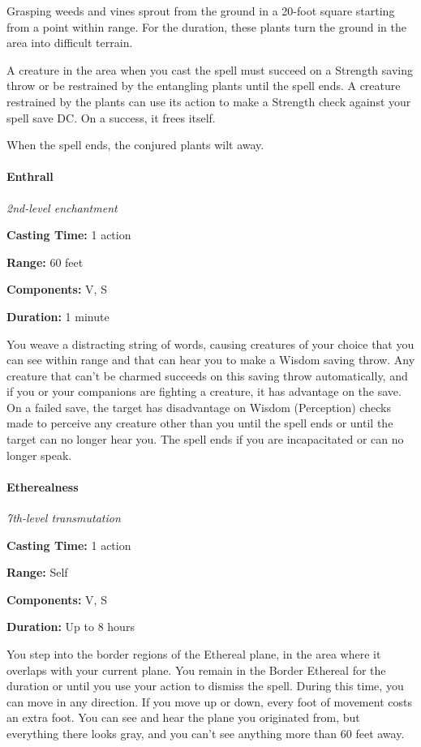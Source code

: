 \documentclass[
]{article}
\begin{document}
Grasping weeds and vines sprout from the ground in a 20-foot square
starting from a point within range. For the duration, these plants turn
the ground in the area into difficult terrain.

A creature in the area when you cast the spell must succeed on a
Strength saving throw or be restrained by the entangling plants until
the spell ends. A creature restrained by the plants can use its action
to make a Strength check against your spell save DC. On a success, it
frees itself.

When the spell ends, the conjured plants wilt away.

\hypertarget{enthrall}{%
\paragraph{Enthrall}\label{enthrall}}

\emph{2nd-level enchantment}

\textbf{Casting Time:} 1 action

\textbf{Range:} 60 feet

\textbf{Components:} V, S

\textbf{Duration:} 1 minute

You weave a distracting string of words, causing creatures of your
choice that you can see within range and that can hear you to make a
Wisdom saving throw. Any creature that can't be charmed succeeds on this
saving throw automatically, and if you or your companions are fighting a
creature, it has advantage on the save. On a failed save, the target has
disadvantage on Wisdom (Perception) checks made to perceive any creature
other than you until the spell ends or until the target can no longer
hear you. The spell ends if you are incapacitated or can no longer
speak.

\hypertarget{etherealness}{%
\paragraph{Etherealness}\label{etherealness}}

\emph{7th-level transmutation}

\textbf{Casting Time:} 1 action

\textbf{Range:} Self

\textbf{Components:} V, S

\textbf{Duration:} Up to 8 hours

You step into the border regions of the Ethereal plane, in the area
where it overlaps with your current plane. You remain in the Border
Ethereal for the duration or until you use your action to dismiss the
spell. During this time, you can move in any direction. If you move up
or down, every foot of movement costs an extra foot. You can see and
hear the plane you originated from, but everything there looks gray, and
you can't see anything more than 60 feet away.
\end{document}
